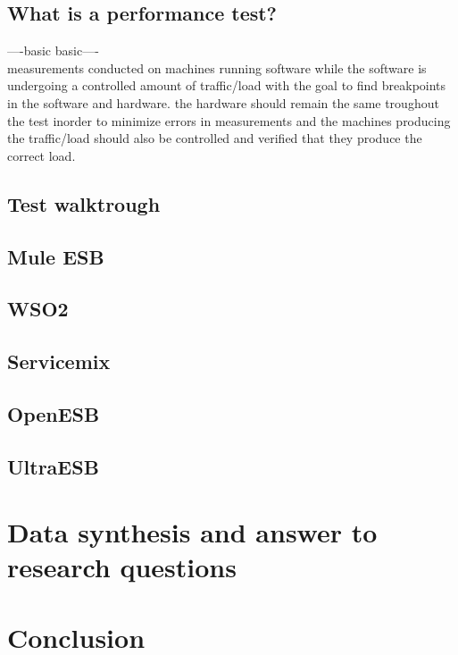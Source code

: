\documentclass{llncs}
\begin{document}
\subsection{What is a performance test?}
----basic basic---- \\
measurements conducted on machines running software while the software is undergoing a controlled amount of traffic/load with the goal to find breakpoints in the software and hardware. the hardware should remain the same troughout the test inorder to minimize errors in measurements and the machines producing the traffic/load should also be controlled and verified that they produce the correct load. 
\subsection{Test walktrough}
	\subsection{Mule ESB}
	\subsection{WSO2}
	\subsection{Servicemix}
	\subsection{OpenESB}
	\subsection{UltraESB}

\section{Data synthesis and answer to research questions}
\section{Conclusion}



\end{document}
